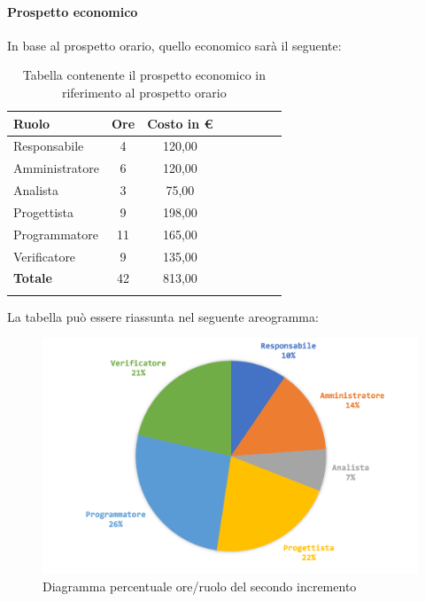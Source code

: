 			\paragraph{Prospetto economico}
			In base al prospetto orario, quello economico sarà il seguente: 
			
			\begin{longtable}{|l|c|c|c|c|c|c|c|}
				\hline
				\rowcolor{lighter-grayer}
				\textbf{Ruolo} & \textbf{Ore} & \textbf{Costo in € } \\
				\hline
				\endfirsthead
				
				\hline
				Responsabile 	    & 4 & 120,00\\
				\hline 
				\hline
				Amministratore	   & 6 & 120,00\\
				\hline
				\hline
				Analista 				& 3 & 75,00\\
				\hline
				\hline
				Progettista 		   & 9 & 198,00\\
				\hline
				\hline
				Programmatore 	  & 11 & 165,00\\
				\hline
				\hline
				Verificatore 		   & 9 & 135,00\\
				\hline
				\textbf{Totale} 	 & 42 & 813,00\\
				\hline
				\caption{Tabella contenente il prospetto economico in riferimento al prospetto orario}
			\end{longtable}
			\pagebreak
			
			La tabella può essere riassunta nel seguente areogramma:
			\begin{figure}[H]
				\centering
				\includegraphics[width=0.8\linewidth]{./images/preventivo/incremento2-2.png}
				\caption{Diagramma percentuale ore/ruolo del secondo incremento}
				\label{fig:diagramma costi ruolo incremento II}
			\end{figure}
	
